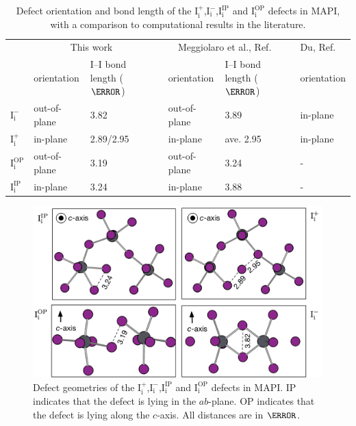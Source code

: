 \begin{table}[h!]\centering
\begin{tabular}{llllllll}\toprule
\phantom{abcd}&\multicolumn{2}{c}{This work} &\phantom{a} &\multicolumn{2}{c}{Meggiolaro et al., Ref. \cite{Meggiolaro2018}}&\phantom{a} & Du, Ref. \cite{Du2015} \\
\cline{2-3} \cline{5-6} \cline{8-8}
& orientation & I--I bond length ($\angstrom$) && orientation & I--I bond length ($\angstrom$) && orientation \\  
\midrule
$\mathrm{I}_\mathrm{i}^-$ &  out-of-plane & 3.82  &&  out-of-plane & 3.89 && in-plane \\
$\mathrm{I}_\mathrm{i}^+$ & in-plane & 2.89/2.95 && in-plane & ave. 2.95 && in-plane \\
$\mathrm{I}_\mathrm{i}^\mathrm{OP}$ & out-of-plane & 3.19 && out-of-plane & 3.24 && - \\
$\mathrm{I}_\mathrm{i}^\mathrm{IP}$ & in-plane & 3.24 && in-plane & 3.88 && - \\
\end{tabular} 
\caption[Defect orientation and bond length of the $\mathrm{I}_\mathrm{i}^+$,$\mathrm{I}_\mathrm{i}^-$,$\mathrm{I}_\mathrm{i}^\mathrm{IP}$ and $\mathrm{I}_\mathrm{i}^\mathrm{OP}$ defects in MAPI]{Defect orientation and bond length of the $\mathrm{I}_\mathrm{i}^+$,$\mathrm{I}_\mathrm{i}^-$,$\mathrm{I}_\mathrm{i}^\mathrm{IP}$ and $\mathrm{I}_\mathrm{i}^\mathrm{OP}$ defects in MAPI, with a comparison to computational results in the literature. }
\end{table}

\begin{figure}[h!]
\centering
  \includegraphics[width=1.0\columnwidth]{figures/ch6/defect_geometries.png}
  \caption[Defect geometries of the $\mathrm{I}_\mathrm{i}^+$,$\mathrm{I}_\mathrm{i}^-$,$\mathrm{I}_\mathrm{i}^\mathrm{IP}$ and $\mathrm{I}_\mathrm{i}^\mathrm{OP}$ defects in MAPI]{Defect geometries of the $\mathrm{I}_\mathrm{i}^+$,$\mathrm{I}_\mathrm{i}^-$,$\mathrm{I}_\mathrm{i}^\mathrm{IP}$ and $\mathrm{I}_\mathrm{i}^\mathrm{OP}$ defects in MAPI. IP indicates that the defect is lying in the $ab$-plane. OP indicates that the defect is lying along the $c$-axis. All distances are in $\angstrom$.}
\label{relaxation_workflow}
\end{figure}

